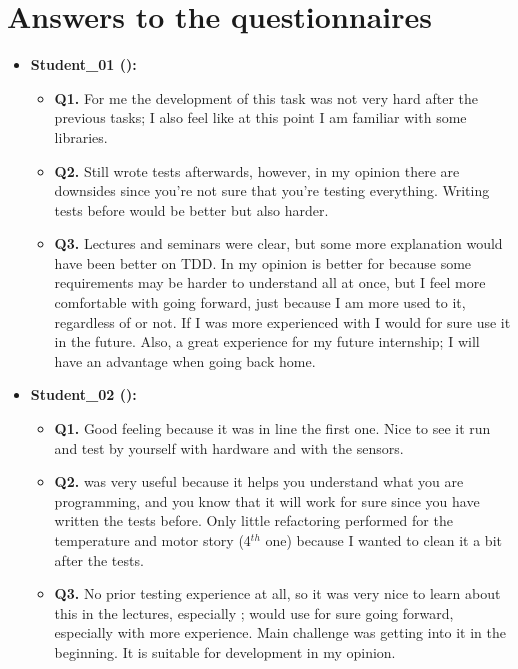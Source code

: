 \section{Answers to the questionnaires}
\begin{itemize}
    \item \textbf{Student\_01 (\tdd):}
    \begin{itemize}
        \item \textbf{Q1.} For me the development of this task was not very hard after the previous tasks; I also feel like at this point I am familiar with some libraries.
        \item \textbf{Q2.} Still wrote tests afterwards, however, in my opinion there are downsides since you're not sure that you're testing everything. Writing tests before would be better but also harder.
        \item \textbf{Q3.} Lectures and seminars were clear, but some more explanation would have been better on TDD. In my opinion \tdd is better for \ess because some requirements may be harder to understand all at once, but I feel more comfortable with \notdd going forward, just because I am more used to it, regardless of \es or not. If I was more experienced with \tdd I would for sure use it in the future. Also, a great experience for my future internship; I will have an advantage when going back home.
    \end{itemize}

    \item \textbf{Student\_02 (\tdd):}
    \begin{itemize}
        \item \textbf{Q1.} Good feeling because it was in line the first one. Nice to see it run and test by yourself with hardware and with the sensors.
        \item \textbf{Q2.} \tdd was very useful because it helps you understand what you are programming, and you know that it will work for sure since you have written the tests before. Only little refactoring performed for the temperature and motor story (4$^{th}$ one) because I wanted to clean it a bit after the tests.
        \item \textbf{Q3.} No prior testing experience at all, so it was very nice to learn about this in the lectures, especially \tdd; would use \tdd for sure going forward, especially with more experience. Main challenge was getting into it in the beginning. It is suitable for \ess development in my opinion.
    \end{itemize}


\end{itemize}
